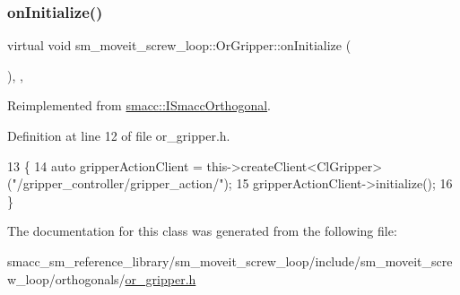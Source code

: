 \subsubsection{\texorpdfstring{on\+Initialize()}{onInitialize()}}
{\footnotesize\ttfamily virtual void sm\+\_\+moveit\+\_\+screw\+\_\+loop\+::\+Or\+Gripper\+::on\+Initialize (\begin{DoxyParamCaption}{ }\end{DoxyParamCaption})\hspace{0.3cm}{\ttfamily [inline]}, {\ttfamily [override]}, {\ttfamily [virtual]}}



Reimplemented from \hyperlink{classsmacc_1_1ISmaccOrthogonal_a6bb31c620cb64dd7b8417f8705c79c7a}{smacc\+::\+I\+Smacc\+Orthogonal}.



Definition at line 12 of file or\+\_\+gripper.\+h.


\begin{DoxyCode}
13     \{
14         \textcolor{keyword}{auto} gripperActionClient = this->createClient<ClGripper>(\textcolor{stringliteral}{"/gripper\_controller/gripper\_action/"});
15         gripperActionClient->initialize();
16     \}
\end{DoxyCode}


The documentation for this class was generated from the following file\+:\begin{DoxyCompactItemize}
\item 
smacc\+\_\+sm\+\_\+reference\+\_\+library/sm\+\_\+moveit\+\_\+screw\+\_\+loop/include/sm\+\_\+moveit\+\_\+screw\+\_\+loop/orthogonals/\hyperlink{sm__moveit__screw__loop_2include_2sm__moveit__screw__loop_2orthogonals_2or__gripper_8h}{or\+\_\+gripper.\+h}\end{DoxyCompactItemize}
